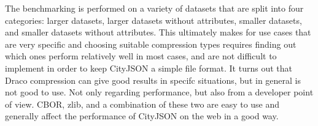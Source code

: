 The benchmarking is performed on a variety of datasets that are split into four categories: larger datasets, larger datasets without attributes, smaller datasets, and smaller datasets without attributes.
This ultimately makes for use cases that are very specific and choosing suitable compression types requires finding out which ones perform relatively well in most cases, and are not difficult to implement in order to keep CityJSON a simple file format.
It turns out that Draco compression can give good results in specifc situations, but in general is not good to use.
Not only regarding performance, but also from a developer point of view.
CBOR, zlib, and a combination of these two are easy to use and generally affect the performance of CityJSON on the web in a good way.

